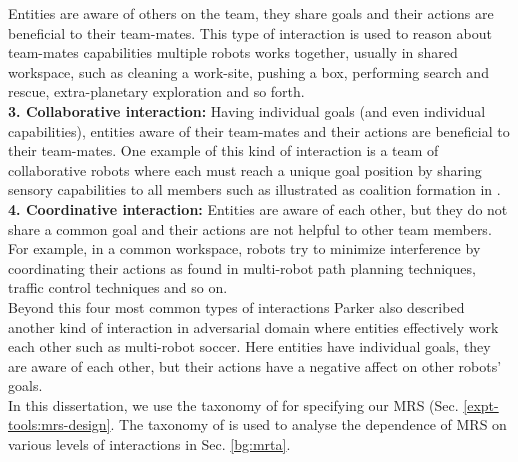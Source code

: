 Entities are aware of others on the team, they share goals and their actions are beneficial to their team-mates. This type of interaction is used to reason about team-mates capabilities multiple robots works together, usually in shared workspace, such as cleaning a work-site, pushing a box, performing search and rescue, extra-planetary exploration and so forth.\\ 
\textbf{3. Collaborative interaction: }
Having individual goals (and even individual capabilities), entities aware of their team-mates and their actions are beneficial to their team-mates. One example of this kind of interaction is a team of collaborative robots where each must reach a unique goal position by sharing sensory capabilities to all members such as illustrated as coalition formation in \cite{Parker+2006}.\\
\textbf{4. Coordinative interaction: }
Entities are aware of each other, but they do not share a common goal and their actions are not helpful to other team members. For example, in a common workspace, robots try to minimize interference by coordinating their actions as found in multi-robot path planning techniques, traffic control techniques and so on.\\
Beyond this four most common types of interactions Parker also described another kind of interaction in adversarial domain where entities effectively work each other such as multi-robot soccer. Here entities have individual goals, they are aware of each other, but their actions have a negative affect on other robots' goals.\\
In this dissertation, we use the taxonomy of  for specifying our MRS (Sec. \ref{expt-tools:mrs-design}. The taxonomy of  is used to analyse the dependence of MRS on various levels of interactions in Sec. \ref{bg:mrta}. 
